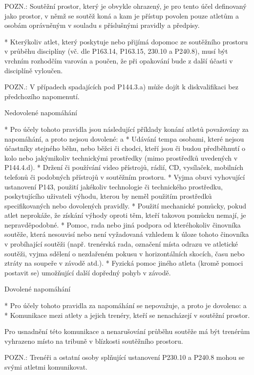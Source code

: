 POZN.: Soutěžní prostor, který je obvykle ohrazený, je pro tento účel definovaný jako prostor, v němž se soutěž koná a kam je přístup povolen pouze atletům a osobám oprávněným v souladu s příslušnými pravidly a předpisy.

* Kterýkoliv atlet, který poskytuje nebo přijímá dopomoc ze soutěžního prostoru v průběhu disciplíny (vč. dle P163.14, P163.15, 230.10 a P240.8), musí být vrchním rozhodčím varován a poučen, že při opakování bude z další účasti v disciplíně vyloučen.

POZN.: V případech spadajících pod P144.3.a) může dojít k diskvalifikaci bez předchozího napomenutí.

Nedovolené napomáhání

* Pro účely tohoto pravidla jsou následující příklady konání atletů považovány za napomáhání, a proto nejsou dovolené:
  \begitems \style a
  * Udávání tempa osobami, které nejsou účastníky stejného běhu, nebo běžci či chodci, kteří jsou či budou předběhnutí o kolo nebo jakýmikoliv technickými prostředky (mimo prostředků uvedených v P144.4.d).
  * Držení či používání video přístrojů, rádií, CD, vysílaček, mobilních telefonů či podobných přístrojů v soutěžním prostoru.
  * Vyjma obuvi vyhovující ustanovení P143, použití jakékoliv technologie či technického prostředku, poskytujícího uživateli výhodu, kterou by neměl použitím prostředků specifikovaných nebo dovolených pravidly.
  * Použití mechanické pomůcky, pokud atlet neprokáže, že získání výhody oproti těm, kteří takovou pomůcku nemají, je nepravděpodobné.
  * Pomoc, rada nebo jiná podpora od kteréhokoliv činovníka soutěže, která nesouvisí nebo není vyžadovaná vzhledem k úloze tohoto činovníka v probíhající soutěži (např. trenérská rada, označení místa odrazu ve atletické soutěži, vyjma sdělení o nezdařeném pokusu v horizontálních skocích, času nebo ztráty na soupeře v závodě atd.).
  * Fyzická pomoc jiného atleta (kromě pomoci postavit se) umožňující další dopředný pohyb v závodě.
  \enditems

Dovolené napomáhání

* Pro účely tohoto pravidla za napomáhání se nepovažuje, a proto je dovoleno:
  \begitems \style a
  * Komunikace mezi atlety a jejich trenéry, kteří se nenacházejí v soutěžní prostor.

  Pro usnadnění této komunikace a nenarušování průběhu soutěže má být trenérům vyhrazeno místo na tribuně v blízkosti soutěžního prostoru.

  POZN.: Trenéři a ostatní osoby splňující ustanovení P230.10 a P240.8 mohou se svými atletmi komunikovat.

